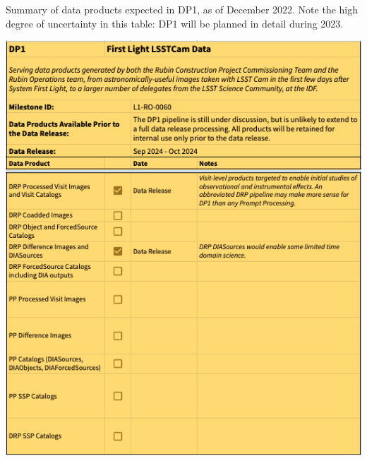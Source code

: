 \begin{table}
\caption{Summary of data products expected in DP1, as of December 2022.
Note the high degree of uncertainty in this table: DP1 will be planned in detail during 2023.}
\label{tab:dp-one-products}
\includegraphics[width=\linewidth]{figures/DP1-products}
\end{table}

